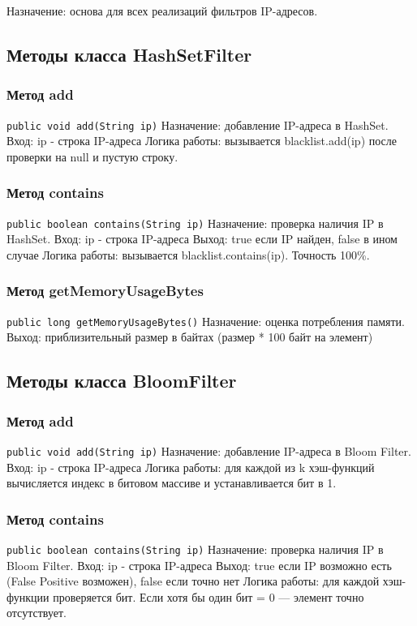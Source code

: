 Назначение: основа для всех реализаций фильтров IP-адресов.

\subsection{Методы класса HashSetFilter}
\subsubsection{Метод add}
\texttt{public void add(String ip)}
Назначение: добавление IP-адреса в HashSet.
Вход: ip - строка IP-адреса
Логика работы: вызывается blacklist.add(ip) после проверки на null и пустую строку.
\subsubsection{Метод contains}
\texttt{public boolean contains(String ip)}
Назначение: проверка наличия IP в HashSet.
Вход: ip - строка IP-адреса
Выход: true если IP найден, false в ином случае
Логика работы: вызывается blacklist.contains(ip). Точность 100\%.
\subsubsection{Метод getMemoryUsageBytes}
\texttt{public long getMemoryUsageBytes()}
Назначение: оценка потребления памяти.
Выход: приблизительный размер в байтах (размер * 100 байт на элемент)

\subsection{Методы класса BloomFilter}
\subsubsection{Метод add}
\texttt{public void add(String ip)}
Назначение: добавление IP-адреса в Bloom Filter.
Вход: ip - строка IP-адреса
Логика работы: для каждой из k хэш-функций вычисляется индекс в битовом массиве и устанавливается бит в 1.
\subsubsection{Метод contains}
\texttt{public boolean contains(String ip)}
Назначение: проверка наличия IP в Bloom Filter.
Вход: ip - строка IP-адреса
Выход: true если IP возможно есть (False Positive возможен), false если точно нет
Логика работы: для каждой хэш-функции проверяется бит. Если хотя бы один бит = 0 — элемент точно отсутствует.
